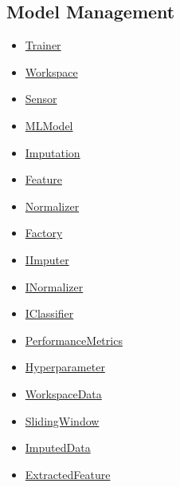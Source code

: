 \subsection{Model Management}
\begin{itemize}
    \item \hyperref[Trainer]{Trainer}
    \item \hyperref[mm-Workspace]{Workspace}
    \item \hyperref[mm-Sensor]{Sensor}
    \item \hyperref[MLModel]{MLModel}
    \item \hyperref[Imputation]{Imputation}
    \item \hyperref[Feature]{Feature}
    \item \hyperref[Normalizer]{Normalizer}
    \item \hyperref[Factory]{Factory}
    \item \hyperref[IImputer]{IImputer}
    \item \hyperref[INormalizer]{INormalizer}
    \item \hyperref[IClassifier]{IClassifier}
    \item \hyperref[PerformanceMetrics]{PerformanceMetrics}
    \item \hyperref[Hyperparameter]{Hyperparameter}
    \item \hyperref[WorkspaceData]{WorkspaceData}
    \item \hyperref[SlidingWindow]{SlidingWindow}
    \item \hyperref[ImputedData]{ImputedData}
    \item \hyperref[ExtractedFeature]{ExtractedFeature}
\end{itemize}


